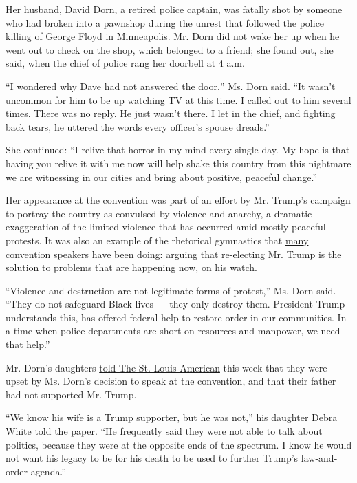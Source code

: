 Her husband, David Dorn, a retired police captain, was fatally shot by
someone who had broken into a pawnshop during the unrest that followed
the police killing of George Floyd in Minneapolis. Mr. Dorn did not wake
her up when he went out to check on the shop, which belonged to a
friend; she found out, she said, when the chief of police rang her
doorbell at 4 a.m.

``I wondered why Dave had not answered the door,'' Ms. Dorn said. ``It
wasn't uncommon for him to be up watching TV at this time. I called out
to him several times. There was no reply. He just wasn't there. I let in
the chief, and fighting back tears, he uttered the words every officer's
spouse dreads.''

She continued: ``I relive that horror in my mind every single day. My
hope is that having you relive it with me now will help shake this
country from this nightmare we are witnessing in our cities and bring
about positive, peaceful change.''

Her appearance at the convention was part of an effort by Mr. Trump's
campaign to portray the country as convulsed by violence and anarchy, a
dramatic exaggeration of the limited violence that has occurred amid
mostly peaceful protests. It was also an example of the rhetorical
gymnastics that
\href{https://www.nytimes3xbfgragh.onion/2020/08/27/us/politics/rnc-trump-convention-night-3.html}{many
convention speakers have been doing}: arguing that re-electing Mr. Trump
is the solution to problems that are happening now, on his watch.

``Violence and destruction are not legitimate forms of protest,'' Ms.
Dorn said. ``They do not safeguard Black lives --- they only destroy
them. President Trump understands this, has offered federal help to
restore order in our communities. In a time when police departments are
short on resources and manpower, we need that help.''

Mr. Dorn's daughters
\href{http://www.stlamerican.com/news/national_news/david-dorn-s-daughters-oppose-father-s-widow-speaking-at-rnc/article_da760964-e7fe-11ea-81fd-8f15f591da91.html}{told
The St. Louis American} this week that they were upset by Ms. Dorn's
decision to speak at the convention, and that their father had not
supported Mr. Trump.

``We know his wife is a Trump supporter, but he was not,'' his daughter
Debra White told the paper. ``He frequently said they were not able to
talk about politics, because they were at the opposite ends of the
spectrum. I know he would not want his legacy to be for his death to be
used to further Trump's law-and-order agenda.''

